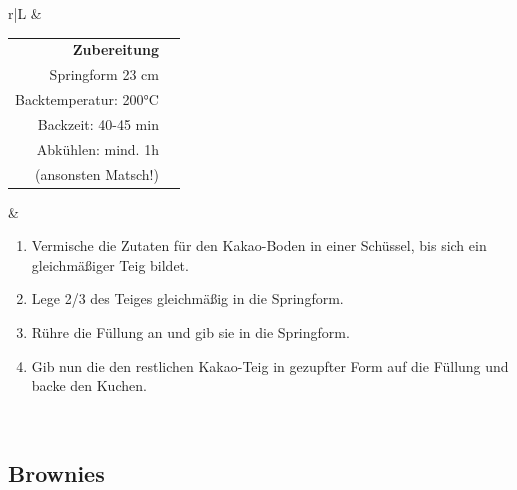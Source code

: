 \documentclass[a4paper, 12pt]{scrbook} 								%
\numberwithin{equation}{section} 									%
\begin{document}
\begin{tabularx}{\textwidth}{r|L}
									&	\\	
			\begin{tabular}[t]{rr}
				\textbf{Zubereitung}	\\
				Springform 23 cm	\\
				Backtemperatur: 200°C	\\
				Backzeit: 40-45 min	\\
				Abkühlen: mind. 1h \\
				(ansonsten Matsch!)\\
			\end{tabular}			&	\begin{enumerate}[nosep]
											\item Vermische die Zutaten für den Kakao-Boden in einer Schüssel, bis sich ein gleichmäßiger Teig bildet.
											\item Lege 2/3 des Teiges gleichmäßig in die Springform.
											\item Rühre die Füllung an und gib sie in die Springform.
											\item Gib nun die den restlichen Kakao-Teig in gezupfter Form auf die Füllung und backe den Kuchen.
										\end{enumerate}	\\
		\end{tabularx}
		\newpage





		\subsection{Brownies}
\end{document}
